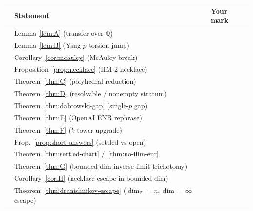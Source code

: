 \documentclass[11pt]{article}
\theoremstyle{definition}
\newcommand{\checkbox}{\fbox{\phantom{X}}}
\begin{document}
\vspace{0.6em}
\noindent
\begin{tabular}{@{}clp{7.8cm}@{}}
\toprule
 & Statement & Your mark \\
\midrule
\checkbox & Lemma~\ref{lem:A} (transfer over $\mathbb{Q}$) & \underline{\hspace{2.5cm}} \\
\checkbox & Lemma~\ref{lem:B} (Yang $p$-torsion jump) & \underline{\hspace{2.5cm}} \\
\checkbox & Corollary~\ref{cor:mcauley} (McAuley break) & \underline{\hspace{2.5cm}} \\
\checkbox & Proposition~\ref{prop:necklace} (HM-2 necklace) & \underline{\hspace{2.5cm}} \\
\checkbox & Theorem~\ref{thm:C} (polyhedral reduction) & \underline{\hspace{2.5cm}} \\
\checkbox & Theorem~\ref{thm:D} (resolvable / nonempty stratum) & \underline{\hspace{2.5cm}} \\
\checkbox & Theorem~\ref{thm:dabrowski-gap} (single-$p$ gap) & \underline{\hspace{2.5cm}} \\
\checkbox & Theorem~\ref{thm:E} (OpenAI ENR rephrase) & \underline{\hspace{2.5cm}} \\
\checkbox & Theorem~\ref{thm:F} ($k$-tower upgrade) & \underline{\hspace{2.5cm}} \\
\checkbox & Prop.~\ref{prop:short-answers} (settled vs open) & \underline{\hspace{2.5cm}} \\
\checkbox & Theorem~\ref{thm:settled-chart} /~\ref{thm:no-ilim-enr} & \underline{\hspace{2.5cm}} \\
\checkbox & Theorem~\ref{thm:G} (bounded-dim inverse-limit trichotomy) & \underline{\hspace{2.5cm}} \\
\checkbox & Corollary~\ref{cor:H} (necklace escape in bounded dim) & \underline{\hspace{2.5cm}} \\
\checkbox & Theorem~\ref{thm:dranishnikov-escape} ($\dim_{\mathbb{Z}}=n,\dim=\infty$ escape) & \underline{\hspace{2.5cm}} \\

\end{tabular}
\end{document}
